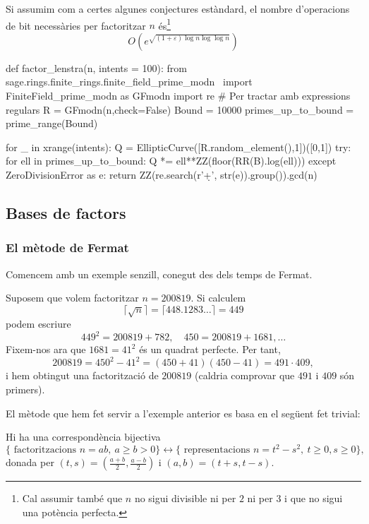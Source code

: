  \begin{theorem}[Lenstra]
 Si assumim com a certes algunes conjectures estàndard, el nombre d'operacions de bit necessàries per factoritzar $n$ és\footnote{Cal assumir també que $n$ no sigui divisible ni per $2$ ni per $3$ i que no sigui una potència perfecta.}
 \[
 O\left(e^{\sqrt{(1+\varepsilon)\log n \log\log n}}\right)
 \]
 \end{theorem}
 
 \begin{python}
 def factor_lenstra(n, intents = 100):
    from sage.rings.finite_rings.finite_field_prime_modn \ 
        import FiniteField_prime_modn as GFmodn
    import re # Per tractar amb expressions regulars
    R = GFmodn(n,check=False)
    Bound = 10000
    primes_up_to_bound = prime_range(Bound)

    for _ in xrange(intents):
        Q = EllipticCurve([R.random_element(),1])([0,1])
        try:
            for ell in primes_up_to_bound:
                Q *= ell**ZZ(floor(RR(B).log(ell)))
        except ZeroDivisionError as e:
            return ZZ(re.search(r'\d+', str(e)).group()).gcd(n)
\end{python}


 \subsection{Bases de factors}
 
 \subsubsection{El mètode de Fermat}
 Comencem amb un exemple senzill, conegut des dels temps de Fermat.

 \begin{example}
  
Suposem que volem factoritzar $n=200819$. Si calculem
 \[
 \lceil\sqrt{n}\rceil=\lceil448.1283\ldots\rceil=449
 \]
 podem escriure
 \[
 449^2 = 200819 + 782,\quad 450 = 200819 + 1681,\ldots
 \]
 Fixem-nos ara que $1681=41^2$ és un quadrat perfecte. Per tant,
 \[
 200819 = 450^2 - 41^2 = (450+41)(450-41) = 491\cdot 409,
 \]
 i hem obtingut una factorització de $200819$ (caldria comprovar que $491$ i $409$ són primers).
  \end{example}
 El mètode que hem fet servir a l'exemple anterior es basa en el següent fet trivial:
 \begin{lemma}
Hi ha una correspondència bijectiva
\[
\{\text{ factoritzacions } n=ab,\ a\geq b>0\}\longleftrightarrow \{\text{ representacions } n=t^2-s^2,\ t\geq 0,s\geq 0\},
\]
donada per $(t,s) = (\frac{a+b}{2},\frac{a-b}{2})$ i $(a,b)=(t+s,t-s)$.
 \end{lemma}
 
